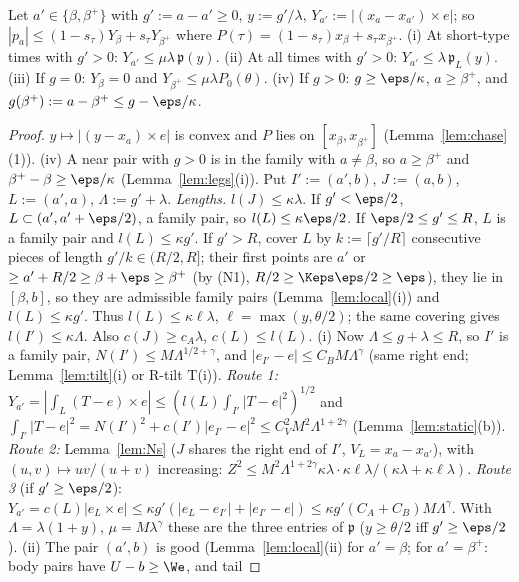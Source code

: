 \begin{lemma}[O: offsets]\label{lem:No}
Let $a'\in\{\beta,\beta^+\}$ with $g':=a-a'\ge0$, $y:=g'/\lambda$, $Y_{a'}:=|(x_a-x_{a'})\times e|$; so $|p_a|\le
(1-s_\tau)Y_\beta+s_\tau Y_{\beta^+}$ where $P(\tau)=(1-s_\tau)x_\beta+s_\tau x_{\beta^+}$.
\textup{(i)} At short-type times with $g'>0$: $Y_{a'}\le\mu\lambda\,\mathfrak p(y)$.
\textup{(ii)} At all times with $g'>0$: $Y_{a'}\le\lambda\,\mathfrak p_L(y)$.
\textup{(iii)} If $g=0$: $Y_\beta=0$ and $Y_{\beta^+}\le\mu\lambda P_0(\theta)$.
\textup{(iv)} If $g>0$: $g\ge\eps/\kappa$, $a\ge\beta^+$, and $g(\beta^+):=a-\beta^+\le g-\eps/\kappa$.
\end{lemma}
\begin{proof}
$y\mapsto|(y-x_a)\times e|$ is convex and $P$ lies on $[x_\beta,x_{\beta^+}]$ (Lemma~\ref{lem:chase}(1)).
(iv) A near pair with $g>0$ is in the family with $a\ne\beta$, so $a\ge\beta^+$ and $\beta^+-\beta\ge\eps/\kappa$
(Lemma~\ref{lem:legs}(i)).
Put $I':=(a',b)$, $J:=(a,b)$, $L:=(a',a)$, $\Lambda:=g'+\lambda$. \emph{Lengths.} $l(J)\le\kappa\lambda$. If $g'<\eps/2$,
$L\subset(a',a'+\eps/2)$, a family pair, so $l(L)\le\kappa\eps/2$. If $\eps/2\le g'\le R$, $L$ is a family pair and
$l(L)\le\kappa g'$. If $g'>R$, cover $L$ by $k:=\lceil g'/R\rceil$ consecutive pieces of length $g'/k\in(R/2,R]$; their first
points are $a'$ or $\ge a'+R/2\ge\beta+\eps\ge\beta^+$ (by (N1), $R/2\ge\Keps\eps/2\ge\eps$), they lie in $[\beta,b]$, so they are
admissible family pairs (Lemma~\ref{lem:local}(i)) and $l(L)\le\kappa g'$. Thus $l(L)\le\kappa\ell\lambda$, $\ell=\max(y,\theta/2)$; the
same covering gives $l(I')\le\kappa\Lambda$. Also $c(J)\ge c_A\lambda$, $c(L)\le l(L)$.
(i) Now $\Lambda\le g+\lambda\le R$, so $I'$ is a family pair, $N(I')\le M\Lambda^{1/2+\gamma}$, and $|e_{I'}-e|\le C_BM\Lambda^\gamma$
(same right end; Lemma~\ref{lem:tilt}(i) or R-tilt T(i)). \emph{Route 1:} $Y_{a'}=|\int_L(T-e)\times e|\le
(l(L)\int_{I'}|T-e|^2)^{1/2}$ and $\int_{I'}|T-e|^2=N(I')^2+c(I')|e_{I'}-e|^2\le C_V^2M^2\Lambda^{1+2\gamma}$ (Lemma~\ref{lem:static}(b)).
\emph{Route 2:} Lemma~\ref{lem:Ns} ($J$ shares the right end of $I'$, $V_L=x_a-x_{a'}$), with $(u,v)\mapsto uv/(u+v)$ increasing:
$Z^2\le M^2\Lambda^{1+2\gamma}\kappa\lambda\cdot\kappa\ell\lambda/(\kappa\lambda+\kappa\ell\lambda)$. \emph{Route 3} (if $g'\ge\eps/2$):
$Y_{a'}=c(L)|e_L\times e|\le\kappa g'(|e_L-e_{I'}|+|e_{I'}-e|)\le\kappa g'(C_A+C_B)M\Lambda^\gamma$. With $\Lambda=\lambda(1+y)$,
$\mu=M\lambda^\gamma$ these are the three entries of $\mathfrak p$ ($y\ge\theta/2$ iff $g'\ge\eps/2$).
(ii) The pair $(a',b)$ is good (Lemma~\ref{lem:local}(ii) for $a'=\beta$; for $a'=\beta^+$: body pairs have $U-b\ge\We$, and tail

\end{proof}
